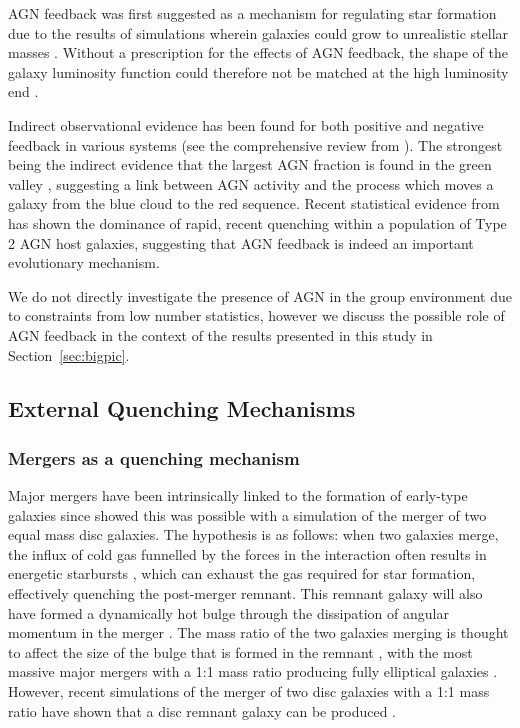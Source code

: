 \documentclass[useAMS,usenatbib]{mn2e}
\begin{document}
AGN feedback was first suggested as a mechanism for regulating star formation due to the results of simulations wherein galaxies could grow to unrealistic stellar masses \citep{silk98, Bower06, Croton06, somerville08}. Without a prescription for the effects of AGN feedback, the shape of the galaxy luminosity function could therefore not be matched at the high luminosity end \citep{baugh98, baugh05, kauffmann99a, kauffmann99b, somerville01, kitzbichler06}. 

Indirect observational evidence has been found for both positive and negative feedback in various systems (see the comprehensive review from \citealt{fabian12}). The strongest being the indirect evidence that the largest AGN fraction is found in the green valley \citep{cowie08, Hickox09, schawinski10a}, suggesting a link between AGN activity and the process which moves a galaxy from the blue cloud to the red sequence. Recent statistical evidence from \cite{smethurst16} has shown the dominance of rapid, recent quenching within a population of Type 2 AGN host galaxies, suggesting that AGN feedback is indeed an important evolutionary mechanism. 

We do not directly investigate the presence of AGN in the group environment due to constraints from low number statistics, however we discuss the possible role of AGN feedback in the context of the results presented in this study in Section~\ref{sec:bigpic}.

 
\subsection{External Quenching Mechanisms}\label{sec:extquench}

\subsubsection{Mergers as a quenching mechanism}\label{sec:mergersquench}

Major mergers have been intrinsically linked to the formation of early-type galaxies since \citet{toomre72} showed this was possible with a simulation of the merger of two equal mass disc galaxies. The hypothesis is as follows: when two galaxies merge, the influx of cold gas funnelled by the forces in the interaction often results in energetic starbursts \citep{mihos94, mihos96, hopkins06d, hopkins08a, hopkins08b, snyder11, hayward14, sparre16}, which can exhaust the gas required for star formation, effectively quenching the post-merger remnant. This remnant galaxy will also have formed a dynamically hot bulge through the dissipation of angular momentum in the merger \citep{toomre77, walker96, kormendy04, hopkins11c, martig12}. The mass ratio of the two galaxies merging is thought to affect the size of the bulge that is formed in the remnant \citep{cox08, hopkins09c, tonini16}, with the most massive major mergers with a 1:1 mass ratio producing fully elliptical galaxies \citep{toomre72, barnes96, mihos96, kauffmann96, pontzen16}. However, recent simulations of the merger of two disc galaxies with a 1:1 mass ratio have shown that a disc remnant galaxy can be produced \citep{hopkins09c, pontzen16, sparre16}. 
\end{document}
